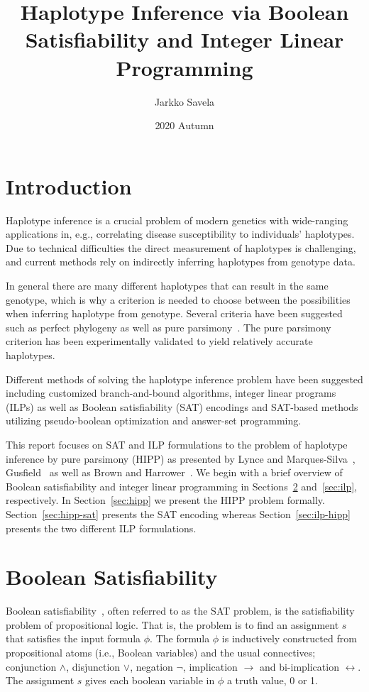 \documentclass[12pt,a4paper]{article}
\title{Haplotype Inference via Boolean Satisfiability and Integer Linear Programming}
\date{2020 Autumn}
\author{Jarkko Savela}
\begin{document}
\maketitle
\newpage
\tableofcontents
\newpage
{}

\section{Introduction}
Haplotype inference is a crucial problem of modern genetics with wide-ranging applications in, e.g., correlating disease susceptibility to individuals' haplotypes.
Due to technical difficulties the direct measurement of haplotypes is challenging, and current methods rely on indirectly inferring haplotypes from genotype data.

In general there are many different haplotypes that can result in the same genotype, 
which is why a criterion is needed to choose between the possibilities when inferring haplotype from genotype.
Several criteria have been suggested such as perfect phylogeny as well as pure parsimony~\cite{gusfield2019integer}.
The pure parsimony criterion has been experimentally validated to yield relatively accurate haplotypes.

Different methods of solving the haplotype inference problem have been suggested including customized branch-and-bound algorithms, integer linear programs (ILPs) as well as Boolean satisfiability (SAT) encodings and SAT-based methods utilizing pseudo-boolean optimization and answer-set programming.

This report focuses on SAT and ILP formulations to the problem of haplotype inference by pure parsimony (HIPP) as presented by Lynce and Marques-Silva~\cite{DBLP:conf/aaai/LynceM06}, Gusfield~\cite{DBLP:conf/cpm/Gusfield03} as well as Brown and Harrower~\cite{DBLP:journals/tcbb/BrownH06}.
We begin with a brief overview of Boolean satisfiability and integer linear programming in Sections~\ref{sec:sat} and~\ref{sec:ilp}, respectively.
In Section~\ref{sec:hipp} we present the HIPP problem formally.
Section~\ref{sec:hipp-sat} presents the SAT encoding whereas 
Section~\ref{sec:ilp-hipp} presents the two different ILP formulations. 



\section{Boolean Satisfiability}
\label{sec:sat}
Boolean satisfiability~\cite{DBLP:series/faia/2009-185}, often referred to as the SAT problem, is the satisfiability problem of propositional logic.
That is, the problem is to find an assignment $s$ that satisfies the input formula $\phi$.
The formula $\phi$ is inductively constructed from propositional atoms (i.e., Boolean variables) and the usual connectives; conjunction $\wedge$, disjunction $\vee$, negation $\neg$, implication $\rightarrow$ and bi-implication $\leftrightarrow$.
The assignment $s$ gives each boolean variable in $\phi$ a truth value, 0 or 1.
\end{document}
